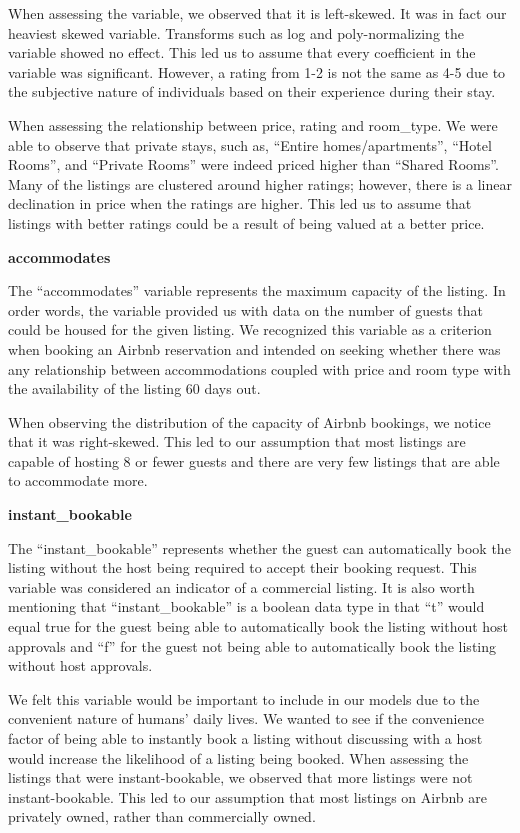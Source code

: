 \documentclass[
]{article}
\begin{document}
When assessing the variable, we observed that it is left-skewed. It was in fact our heaviest skewed variable. Transforms such as log and poly-normalizing the variable showed no effect. This led us to assume that every coefficient in the variable was significant. However, a rating from 1-2 is not the same as 4-5 due to the subjective nature of individuals based on their experience during their stay.

When assessing the relationship between price, rating and room\_type. We were able to observe that private stays, such as, ``Entire homes/apartments'', ``Hotel Rooms'', and ``Private Rooms'' were indeed priced higher than ``Shared Rooms''. Many of the listings are clustered around higher ratings; however, there is a linear declination in price when the ratings are higher. This led us to assume that listings with better ratings could be a result of being valued at a better price.

\textbf{accommodates}

The ``accommodates'' variable represents the maximum capacity of the listing. In order words, the variable provided us with data on the number of guests that could be housed for the given listing. We recognized this variable as a criterion when booking an Airbnb reservation and intended on seeking whether there was any relationship between accommodations coupled with price and room type with the availability of the listing 60 days out.

When observing the distribution of the capacity of Airbnb bookings, we notice that it was right-skewed. This led to our assumption that most listings are capable of hosting 8 or fewer guests and there are very few listings that are able to accommodate more.

\textbf{instant\_bookable}

The ``instant\_bookable'' represents whether the guest can automatically book the listing without the host being required to accept their booking request. This variable was considered an indicator of a commercial listing. It is also worth mentioning that ``instant\_bookable'' is a boolean data type in that ``t'' would equal true for the guest being able to automatically book the listing without host approvals and ``f'' for the guest not being able to automatically book the listing without host approvals.

We felt this variable would be important to include in our models due to the convenient nature of humans' daily lives. We wanted to see if the convenience factor of being able to instantly book a listing without discussing with a host would increase the likelihood of a listing being booked. When assessing the listings that were instant-bookable, we observed that more listings were not instant-bookable. This led to our assumption that most listings on Airbnb are privately owned, rather than commercially owned.
\end{document}
